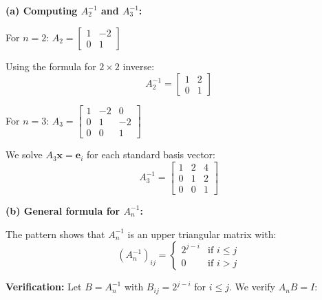 \documentclass[reqno, answers]{exam}
\begin{document}
\begin{questions}

\begin{solution}
\textbf{(a) Computing $A_2^{-1}$ and $A_3^{-1}$:}

For $n = 2$: $A_2 = \begin{bmatrix} 1 & -2 \\ 0 & 1 \end{bmatrix}$

Using the formula for $2 \times 2$ inverse:
\[
A_2^{-1} = \begin{bmatrix} 1 & 2 \\ 0 & 1 \end{bmatrix}
\]

For $n = 3$: $A_3 = \begin{bmatrix} 1 & -2 & 0 \\ 0 & 1 & -2 \\ 0 & 0 & 1 \end{bmatrix}$

We solve $A_3 \mathbf{x} = \mathbf{e}_i$ for each standard basis vector:
\[
A_3^{-1} = \begin{bmatrix} 1 & 2 & 4 \\ 0 & 1 & 2 \\ 0 & 0 & 1 \end{bmatrix}
\]

\textbf{(b) General formula for $A_n^{-1}$:}

The pattern shows that $A_n^{-1}$ is an upper triangular matrix with:
\[
(A_n^{-1})_{ij} = \begin{cases} 2^{j-i} & \text{if } i \leq j \\ 0 & \text{if } i > j \end{cases}
\]

\textbf{Verification:} Let $B = A_n^{-1}$ with $B_{ij} = 2^{j-i}$ for $i \leq j$. We verify $A_n B = I$:


\end{solution}
\end{questions}
\end{document}
